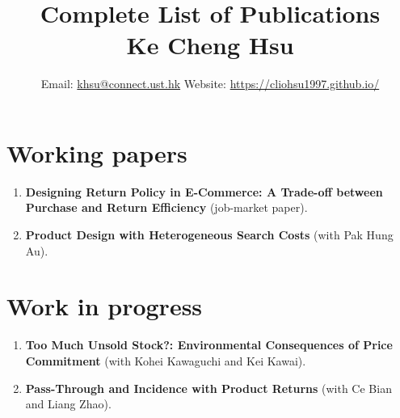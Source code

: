 \documentclass[11pt]{article}
\title{Complete List of Publications\\{\large Ke Cheng Hsu}}
\author{Email: \href{mailto:khsu@connect.ust.hk}{khsu@connect.ust.hk} \quad Website: \href{https://cliohsu1997.github.io/}{https://cliohsu1997.github.io/}}
\date{}
\begin{document}
\maketitle
\vspace{-1.5em}

\section*{Working papers}
\begin{enumerate}[leftmargin=*]
\item \textbf{Designing Return Policy in E-Commerce: A Trade-off between Purchase and Return Efficiency} (job-market paper).
\item \textbf{Product Design with Heterogeneous Search Costs} (with Pak Hung Au).
\end{enumerate}

\section*{Work in progress}
\begin{enumerate}[leftmargin=*, resume]
\item \textbf{Too Much Unsold Stock?: Environmental Consequences of Price Commitment} (with Kohei Kawaguchi and Kei Kawai).
\item \textbf{Pass-Through and Incidence with Product Returns} (with Ce Bian and Liang Zhao).
\end{enumerate}
\end{document}
